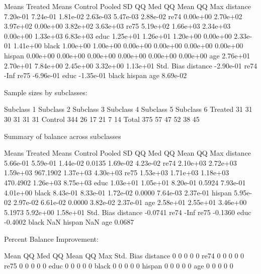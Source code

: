 \documentclass[oneside,letterpaper,titlepage]{article}
\begin{document}
\begin{enumerate}
\begin{Schunk}
\begin{Soutput}
         Means Treated Means Control Pooled SD    QQ Med   QQ Mean    QQ Max
distance      7.20e-01      7.24e-01  1.81e-02  2.63e-03  5.47e-03  2.88e-02
re74          0.00e+00      2.70e+02  3.97e+02  0.00e+00  3.82e+02  3.63e+03
re75          5.19e+02      1.66e+03  2.34e+03  0.00e+00  1.33e+03  6.83e+03
educ          1.25e+01      1.26e+01  1.20e+00  0.00e+00  2.33e-01  1.41e+00
black         1.00e+00      1.00e+00  0.00e+00  0.00e+00  0.00e+00  0.00e+00
hispan        0.00e+00      0.00e+00  0.00e+00  0.00e+00  0.00e+00  0.00e+00
age           2.76e+01      2.70e+01  7.84e+00  2.45e+00  3.32e+00  1.13e+01
         Std. Bias
distance -2.90e-01
re74          -Inf
re75     -6.96e-01
educ     -1.35e-01
black             
hispan            
age       8.69e-02


Sample sizes by subclasses:

        Subclass 1 Subclass 2 Subclass 3 Subclass 4 Subclass 5 Subclass 6
Treated         31         31         30         31         31         31
Control        344         26         17         21          7         14
Total          375         57         47         52         38         45

Summary of balance across subclasses

         Means Treated Means Control Pooled SD   QQ Med  QQ Mean   QQ Max
distance      5.66e-01      5.59e-01  1.44e-02   0.0135 1.69e-02 4.23e-02
re74          2.10e+03      2.72e+03  1.59e+03 967.1902 1.37e+03 4.30e+03
re75          1.53e+03      1.71e+03  1.18e+03 470.4902 1.26e+03 8.75e+03
educ          1.03e+01      1.05e+01  8.20e-01   0.5924 7.93e-01 4.01e+00
black         8.43e-01      8.33e-01  1.72e-02   0.0000 7.64e-03 2.37e-01
hispan        5.95e-02      2.97e-02  6.61e-02   0.0000 3.82e-02 2.37e-01
age           2.58e+01      2.55e+01  3.46e+00   5.1973 5.92e+00 1.58e+01
         Std. Bias
distance   -0.0741
re74          -Inf
re75       -0.1360
educ       -0.4002
black          NaN
hispan         NaN
age         0.0687

Percent Balance Improvement:

         Mean QQ Med QQ Mean QQ Max Std. Bias
distance    0      0       0      0         0
re74        0      0       0      0         0
re75        0      0       0      0         0
educ        0      0       0      0         0
black       0      0       0      0         0
hispan      0      0       0      0         0
age         0      0       0      0         0


\end{Soutput}
\end{Schunk}


\end{enumerate}
\end{document}
